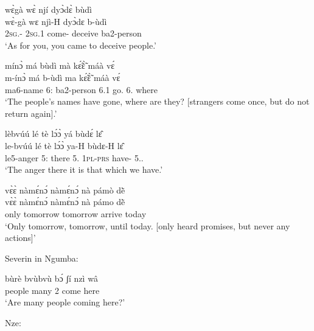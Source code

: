 \begin{exe}[(C234)]
\exC\label{46} 
  \glll  wɛ̀gà wɛ̀ njí dyɔ̀dɛ̀ bùdì \\
         wɛ̀-gà wɛ njì-H dyɔ̀dɛ b-ùdì \\
          2\textsc{sg}.{\SBJ}-{\CONTR} 2\textsc{sg}.{\PST}1 come-{\R} deceive ba2-person   \\
    \trans `As for you, you came to deceive people.'
 
\exC\label{47} 
  \glll   mínɔ̀ má bùdì mà kɛ̃́ɛ̃̀ máà vɛ́ \\
          m-ínɔ̀ má b-ùdì ma kɛ̃́ɛ̃̀ máà vɛ́ \\
            ma6-name 6:{\ATT}  ba2-person 6.{\PST}1 go.{\COMPL} 6.{\COP} where \\
    \trans `The people's names have gone, where are they? [strangers come once, but do not return again].'
 
\exC\label{48} 
  \glll  lèbvúú  lé tè lɔ́ɔ̀ yá bùdɛ́ lɛ̂ \\
         le-bvúú  lé tè lɔ́ɔ̀ ya-H bùdɛ-H lɛ̂ \\
         le5-anger 5:{\ATT}  there 5.{\COP} 1\textsc{pl}-\textsc{prs} have-{\R} 5.{\DEM}.{\PROX}    \\
    \trans `The anger there it is that which we have.'
 
\exC\label{49}
  \glll   vɛ̀ɛ̀ nàmɛ́nɔ́ nàmɛ́nɔ́ nà pámò dẽ̀ \\
       vɛ̀ɛ̀ nàmɛ́nɔ́ nàmɛ́nɔ́ nà pámo dẽ̀ \\
            only tomorrow tomorrow {\COM} arrive today \\
    \trans `Only tomorrow, tomorrow, until today. [only heard promises, but never any actions]'
\end{exe}

\noindent Severin in Ngumba:

\begin{exe} 
\exC\label{50}
  \gll  bùrè bvùbvù bɔ́ ʃí nzì wâ  \\
           people many 2 {\PROG} come here  \\
    \trans `Are many people coming here?'
\end{exe}

\noindent Nze:

